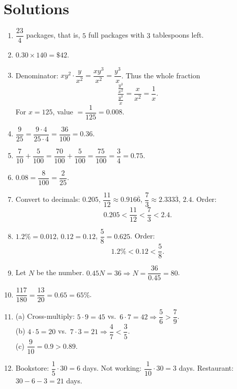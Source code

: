 \documentclass{article}
\begin{document}
\newpage
\section*{Solutions}

\begin{enumerate}[label=\textbf{\arabic*.}, leftmargin=*, itemsep=0.45em]

\item $\dfrac{23}{4}$ packages, that is, $5$ full packages with $3$ tablespoons left.

\item $0.30\times 140=\$42$.

\item Denominator: $x y^2\cdot \dfrac{y}{x^2}=\dfrac{x y^3}{x^2}=\dfrac{y^3}{x}$. Thus the whole fraction
\[
\frac{\frac{y^3}{x^2}}{\frac{y^3}{x}}=\frac{x}{x^2}=\frac{1}{x}.
\]
For $x=125$, value $=\dfrac{1}{125}=0.008$.

\item $\dfrac{9}{25}=\dfrac{9\cdot 4}{25\cdot 4}=\dfrac{36}{100}=0.36$.

\item $\dfrac{7}{10}+\dfrac{5}{100}=\dfrac{70}{100}+\dfrac{5}{100}=\dfrac{75}{100}=\dfrac{3}{4}=0.75$.

\item $0.08=\dfrac{8}{100}=\dfrac{2}{25}$.

\item Convert to decimals: $0.205$, $\dfrac{11}{12}\approx 0.916\overline{6}$, $\dfrac{7}{3}\approx 2.333\overline{3}$, $2.4$. Order:
\[
0.205<\frac{11}{12}<\frac{7}{3}<2.4.
\]

\item $1.2\%=0.012$, $0.12=0.12$, $\dfrac{5}{8}=0.625$. Order:
\[
1.2\%<0.12<\frac{5}{8}.
\]

\item Let $N$ be the number. $0.45N=36 \Rightarrow N=\dfrac{36}{0.45}=80$.

\item $\dfrac{117}{180}=\dfrac{13}{20}=0.65=65\%$.

\item (a) Cross-multiply: $5\cdot 9=45$ vs.\ $6\cdot 7=42 \Rightarrow \dfrac{5}{6}>\dfrac{7}{9}$.\\
(b) $4\cdot 5=20$ vs.\ $7\cdot 3=21 \Rightarrow \dfrac{4}{7}<\dfrac{3}{5}$.\\
(c) $\dfrac{9}{10}=0.9>0.89$.

\item Bookstore: $\dfrac{1}{5}\cdot 30=6$ days. Not working: $\dfrac{1}{10}\cdot 30=3$ days. Restaurant: $30-6-3=21$ days.

\end{enumerate}
\end{document}

